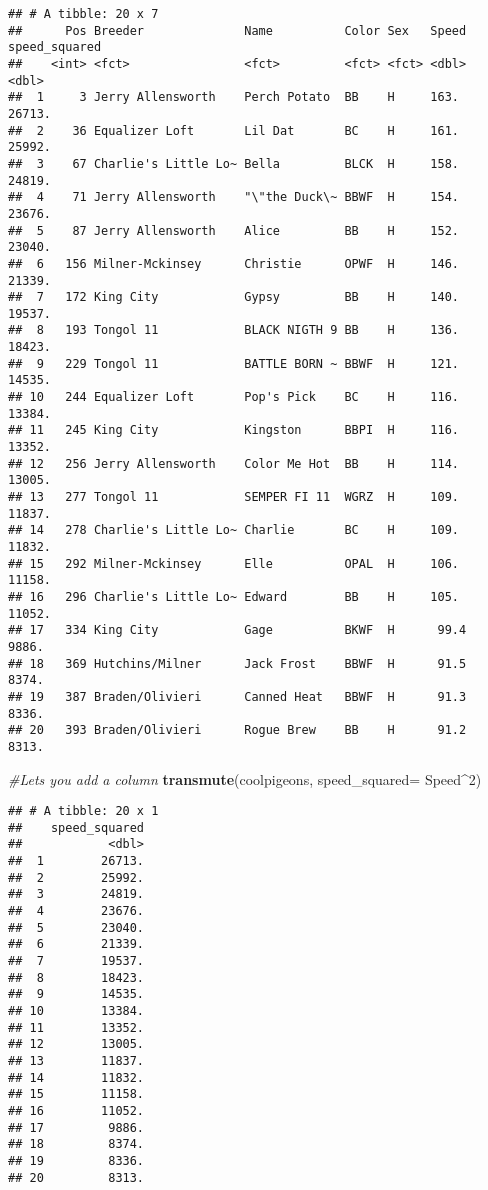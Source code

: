 \documentclass[]{article}
\newenvironment{Shaded}{\begin{snugshade}}{\end{snugshade}}
\newcommand{\KeywordTok}[1]{\textcolor[rgb]{0.13,0.29,0.53}{\textbf{#1}}}
\newcommand{\DataTypeTok}[1]{\textcolor[rgb]{0.13,0.29,0.53}{#1}}
\newcommand{\DecValTok}[1]{\textcolor[rgb]{0.00,0.00,0.81}{#1}}
\newcommand{\CommentTok}[1]{\textcolor[rgb]{0.56,0.35,0.01}{\textit{#1}}}
\newcommand{\OperatorTok}[1]{\textcolor[rgb]{0.81,0.36,0.00}{\textbf{#1}}}
\newcommand{\NormalTok}[1]{#1}
\begin{document}
\begin{verbatim}
## # A tibble: 20 x 7
##      Pos Breeder              Name          Color Sex   Speed speed_squared
##    <int> <fct>                <fct>         <fct> <fct> <dbl>         <dbl>
##  1     3 Jerry Allensworth    Perch Potato  BB    H     163.         26713.
##  2    36 Equalizer Loft       Lil Dat       BC    H     161.         25992.
##  3    67 Charlie's Little Lo~ Bella         BLCK  H     158.         24819.
##  4    71 Jerry Allensworth    "\"the Duck\~ BBWF  H     154.         23676.
##  5    87 Jerry Allensworth    Alice         BB    H     152.         23040.
##  6   156 Milner-Mckinsey      Christie      OPWF  H     146.         21339.
##  7   172 King City            Gypsy         BB    H     140.         19537.
##  8   193 Tongol 11            BLACK NIGTH 9 BB    H     136.         18423.
##  9   229 Tongol 11            BATTLE BORN ~ BBWF  H     121.         14535.
## 10   244 Equalizer Loft       Pop's Pick    BC    H     116.         13384.
## 11   245 King City            Kingston      BBPI  H     116.         13352.
## 12   256 Jerry Allensworth    Color Me Hot  BB    H     114.         13005.
## 13   277 Tongol 11            SEMPER FI 11  WGRZ  H     109.         11837.
## 14   278 Charlie's Little Lo~ Charlie       BC    H     109.         11832.
## 15   292 Milner-Mckinsey      Elle          OPAL  H     106.         11158.
## 16   296 Charlie's Little Lo~ Edward        BB    H     105.         11052.
## 17   334 King City            Gage          BKWF  H      99.4         9886.
## 18   369 Hutchins/Milner      Jack Frost    BBWF  H      91.5         8374.
## 19   387 Braden/Olivieri      Canned Heat   BBWF  H      91.3         8336.
## 20   393 Braden/Olivieri      Rogue Brew    BB    H      91.2         8313.
\end{verbatim}

\begin{Shaded}
\begin{Highlighting}[]
\CommentTok{#Lets you add a column}
\KeywordTok{transmute}\NormalTok{(coolpigeons, }\DataTypeTok{speed_squared=}\NormalTok{ Speed}\OperatorTok{^}\DecValTok{2}\NormalTok{)}
\end{Highlighting}
\end{Shaded}

\begin{verbatim}
## # A tibble: 20 x 1
##    speed_squared
##            <dbl>
##  1        26713.
##  2        25992.
##  3        24819.
##  4        23676.
##  5        23040.
##  6        21339.
##  7        19537.
##  8        18423.
##  9        14535.
## 10        13384.
## 11        13352.
## 12        13005.
## 13        11837.
## 14        11832.
## 15        11158.
## 16        11052.
## 17         9886.
## 18         8374.
## 19         8336.
## 20         8313.
\end{verbatim}
\end{document}

